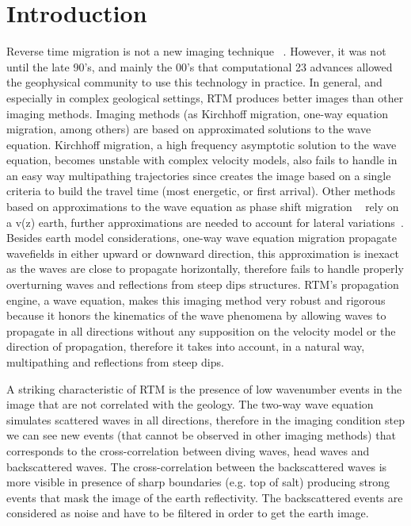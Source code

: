 \section{Introduction}

Reverse time migration is not a new imaging technique ~\citep{baysal:1514, whitmore:382, GPR:GPR413}.
However, it was not until the late 90’s, and mainly the 00’s that computational
23 advances allowed the geophysical community to use this technology in practice. In general, and 
especially in complex geological settings, RTM produces better images than other imaging methods.
 Imaging methods (as Kirchhoff migration, one-way equation migration, among others) are based
 on approximated solutions to the wave equation. Kirchhoff migration, a high frequency asymptotic
 solution to the wave equation, becomes unstable with complex velocity models, also fails to handle
 in an easy way multipathing trajectories since creates the image based on a single criteria to build
 the travel time (most energetic, or first arrival). Other methods based on approximations to the wave
 equation as phase shift migration ~\citep{gazdag:1342} 
rely on a v(z) earth, further approximations are needed to account for lateral variations~\citep{gazdag:124}.
 Besides earth model considerations, one-way wave equation migration propagate wavefields in 
either upward or downward direction, this approximation is inexact as the waves are close
to propagate horizontally, therefore fails to handle properly overturning
waves and reflections from steep dips structures. RTM's propagation engine, a wave equation, 
makes this imaging method very robust and rigorous because it honors the kinematics of 
the wave phenomena by allowing waves to propagate in all directions without any supposition
on the velocity model or the direction of propagation, therefore it takes into account, in a natural way,  
multipathing and  reflections from steep dips.

A striking characteristic of RTM is the presence of low wavenumber events in the image that
 are not correlated with the geology. The two-way wave equation simulates scattered waves in all 
directions, therefore in the imaging condition step we can see new events (that cannot be observed in 
other imaging methods) that corresponds to the cross-correlation between diving waves, head waves 
and backscattered waves. The cross-correlation between the backscattered waves is more visible in
presence of sharp boundaries (e.g. top of salt) producing strong events that mask the image of the 
earth reflectivity. The backscattered events are considered as noise and have to be filtered in order
to get the earth image.

